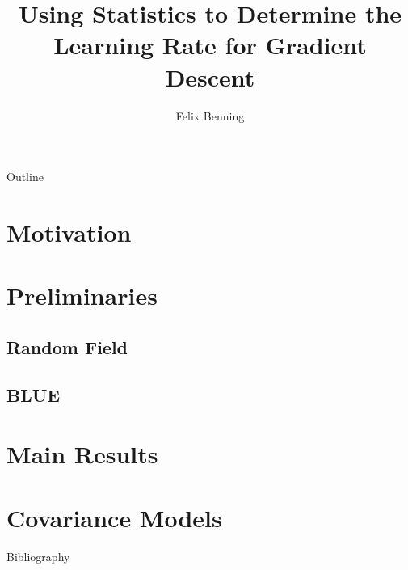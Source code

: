 \documentclass[
	handout,
	hyperref={unicode, colorlinks=true, linkcolor=.}
]{beamer}
\title{Using Statistics to Determine the Learning Rate for Gradient Descent}
\author{Felix Benning}
\institute{University of Mannheim}
\begin{document}
	\frame{\titlepage}

	\begin{frame}{Outline}
		\tableofcontents
	\end{frame}


	\section{Motivation}

	
	
	
	

	\section{Preliminaries}

	\subsection{Random Field}
	
	

	\subsection{BLUE}
	

	\section{Main Results}

	

	\section{Covariance Models}


	\appendix

	\begin{frame}[allowframebreaks]{Bibliography}
		\printbibliography
	\end{frame}
\end{document}
